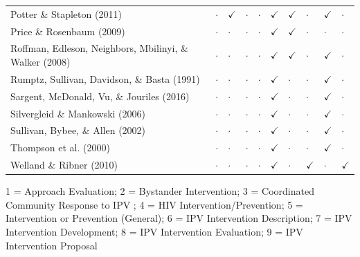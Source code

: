 \documentclass[11pt,]{tufte-book}
\begin{document}
\begin{longtable}[]{@{}llllllllll@{}}
Potter \& Stapleton (2011) & \(\cdot\) & \(\checkmark\) & \(\cdot\) &
\(\cdot\) & \(\checkmark\) & \(\checkmark\) & \(\cdot\) & \(\checkmark\)
& \(\cdot\)\tabularnewline
Price \& Rosenbaum (2009) & \(\cdot\) & \(\cdot\) & \(\cdot\) &
\(\cdot\) & \(\checkmark\) & \(\checkmark\) & \(\cdot\) & \(\cdot\) &
\(\cdot\)\tabularnewline
Roffman, Edleson, Neighbors, Mbilinyi, \& Walker (2008) & \(\cdot\) &
\(\cdot\) & \(\cdot\) & \(\cdot\) & \(\checkmark\) & \(\checkmark\) &
\(\cdot\) & \(\checkmark\) & \(\cdot\)\tabularnewline
Rumptz, Sullivan, Davidson, \& Basta (1991) & \(\cdot\) & \(\cdot\) &
\(\cdot\) & \(\cdot\) & \(\checkmark\) & \(\cdot\) & \(\cdot\) &
\(\checkmark\) & \(\cdot\)\tabularnewline
Sargent, McDonald, Vu, \& Jouriles (2016) & \(\cdot\) & \(\cdot\) &
\(\cdot\) & \(\cdot\) & \(\checkmark\) & \(\cdot\) & \(\cdot\) &
\(\checkmark\) & \(\cdot\)\tabularnewline
Silvergleid \& Mankowski (2006) & \(\cdot\) & \(\cdot\) & \(\cdot\) &
\(\cdot\) & \(\checkmark\) & \(\cdot\) & \(\cdot\) & \(\checkmark\) &
\(\cdot\)\tabularnewline
Sullivan, Bybee, \& Allen (2002) & \(\cdot\) & \(\cdot\) & \(\cdot\) &
\(\cdot\) & \(\checkmark\) & \(\cdot\) & \(\cdot\) & \(\checkmark\) &
\(\cdot\)\tabularnewline
Thompson et al. (2000) & \(\cdot\) & \(\cdot\) & \(\cdot\) & \(\cdot\) &
\(\checkmark\) & \(\cdot\) & \(\cdot\) & \(\checkmark\) &
\(\cdot\)\tabularnewline
Welland \& Ribner (2010) & \(\cdot\) & \(\cdot\) & \(\cdot\) & \(\cdot\)
& \(\checkmark\) & \(\cdot\) & \(\checkmark\) & \(\cdot\) &
\(\checkmark\)\tabularnewline
\bottomrule
\end{longtable}

1 = Approach Evaluation; 2 = Bystander Intervention; 3 = Coordinated
Community Response to IPV ; 4 = HIV Intervention/Prevention; 5 =
Intervention or Prevention (General); 6 = IPV Intervention Description;
7 = IPV Intervention Development; 8 = IPV Intervention Evaluation; 9 =
IPV Intervention Proposal
\end{document}
